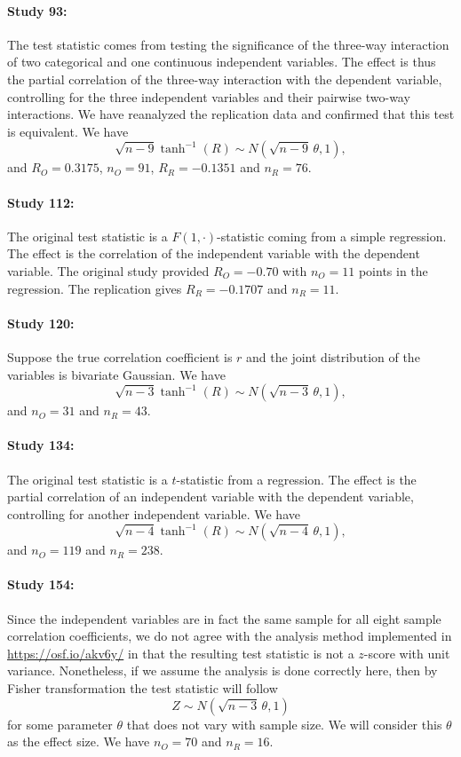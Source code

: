 \documentclass[11pt]{article}
\theoremstyle{definition}
\theoremstyle{custom}
\begin{document}
  \paragraph{Study 93: \citet{Murray:2008il}}
  The test statistic comes from testing the significance of the three-way interaction of two categorical and one continuous independent variables. The effect is thus the partial correlation of the three-way interaction with the dependent variable, controlling for the three independent variables and their pairwise two-way interactions. We have reanalyzed the replication data and confirmed that this test is equivalent. We have
  \[
  \sqrt{n - 9} \tanh^{-1}(R) \sim N(\sqrt{n - 9} \,\theta, 1),
  \]
  and $R_O = 0.3175$, $n_O = 91$, $R_R = -0.1351$ and $n_R = 76$.

  \paragraph{Study 112: \citet{McKinstry:2008ez}}
  The original test statistic is a $F(1, \cdot)$-statistic coming from a simple regression. The effect is the correlation of the independent variable with the dependent variable. The original study provided $R_O = -0.70$ with $n_O = 11$ points in the regression. The replication gives $R_R = -0.1707$ and $n_R = 11$.

  \paragraph{Study 120: \citet{Hajcak:2008kw}}
  Suppose the true correlation coefficient is $r$ and the joint distribution of the variables is bivariate Gaussian. We have
  \[
  \sqrt{n-3} \tanh^{-1}(R) \sim N(\sqrt{n-3} \,\theta, 1),
  \]
  and $n_O = 31$ and $n_R = 43$.

  \paragraph{Study 134: \citet{Larsen:2008tu}}
  The original test statistic is a $t$-statistic from a regression. The effect is the partial correlation of an independent variable with the dependent variable, controlling for another independent variable. We have
  \[
  \sqrt{n - 4} \tanh^{-1}(R) \sim N(\sqrt{n - 4} \,\theta, 1),
  \]
  and $n_O = 119$ and $n_R = 238$.

  \paragraph{Study 154: \citet{Heine:2008fx}}
  Since the independent variables are in fact the same sample for all eight sample correlation coefficients, we do not agree with the analysis method implemented in \url{https://osf.io/akv6y/} in that the resulting test statistic is not a $z$-score with unit variance. Nonetheless, if we assume the analysis is done correctly here, then by Fisher transformation the test statistic will follow
  \[
  Z \sim N(\sqrt{n - 3} \,\theta, 1)
  \]
  for some parameter $\theta$ that does not vary with sample size. We will consider this $\theta$ as the effect size. We have $n_O = 70$ and $n_R = 16$.
\end{document}
